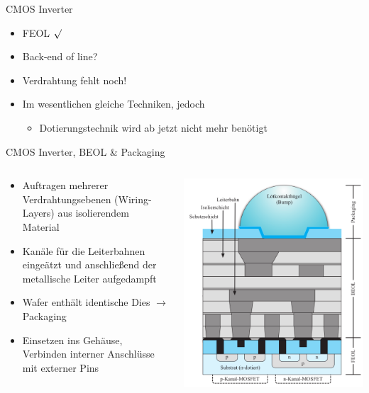 \documentclass[12pt%
,aspectratio=169%
]{beamer}
\begin{document}
\begin{frame}{CMOS Inverter}
\begin{itemize}
	\item FEOL $\surd$
	\item Back-end of line?
	\item Verdrahtung fehlt noch!
	\item Im wesentlichen gleiche Techniken, jedoch
	\begin{itemize}
		\item Dotierungstechnik wird ab jetzt nicht mehr benötigt
	\end{itemize}
\end{itemize}
\end{frame}

\begin{frame}{CMOS Inverter, BEOL \& Packaging}
\begin{columns}[T] %
\begin{column}{.58\textwidth}
\begin{itemize}
	\item Auftragen mehrerer Verdrahtungsebenen (Wiring-Layers) aus isolierendem Material
	\item Kanäle für die Leiterbahnen eingeätzt und anschließend der metallische Leiter aufgedampft
	\item Wafer enthält identische Dies $\to$ Packaging
	\item Einsetzen ins Gehäuse, Verbinden interner Anschlüsse mit externer Pins
\end{itemize}
\end{column}%
\hfill%
\begin{column}{.38\textwidth}
\centering
\vspace*{-1cm}
\hspace*{-1cm}
\includegraphics[scale=0.3]{pictures/querschnitt_cmos_inverter}

\end{column}
\end{columns}
\end{frame}
\end{document}

